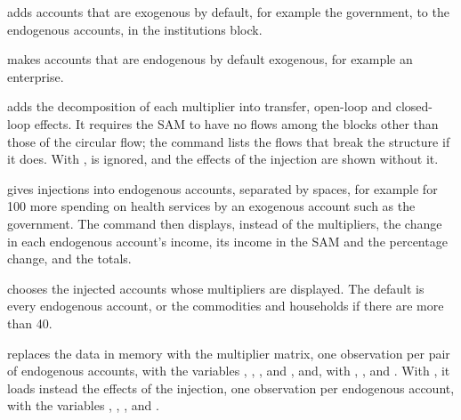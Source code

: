 
\begin{optdesc}
\item[\optarg{endo}{genous}{accounts}] adds accounts that are exogenous by
default, for example the government, to the endogenous accounts, in the
institutions block.

\item[\optarg{exo}{genous}{accounts}] makes accounts that are endogenous by
default exogenous, for example an enterprise.

\item[\opt{decomp}{ose}] adds the decomposition of each multiplier into
transfer, open-loop and closed-loop effects. It requires the SAM to have no
flows among the blocks other than those of the circular flow; the command lists
the flows that break the structure if it does. With ,
 is ignored, and the effects of the injection are shown
without it.

\item[\optarg{inj}{ect}{\argu{account}\texttt{:}\argu{value} \dots}] gives
injections into endogenous accounts, separated by spaces, for example
 for 100 more spending on health services by an
exogenous account such as the government. The command then displays, instead
of the multipliers, the change in each endogenous account's income, its income
in the SAM and the percentage change, and the totals.

\item[\optarg{acc}{ounts}{accounts}] chooses the injected accounts whose
multipliers are displayed. The default is every endogenous account, or the
commodities and households if there are more than 40.

\item[\opt{}{clear}] replaces the data in memory with the multiplier matrix,
one observation per pair of endogenous accounts, with the variables
, , ,  and
, and, with , ,
 and . With , it loads instead the effects of
the injection, one observation per endogenous account, with the variables
, , ,  and .
\end{optdesc}


